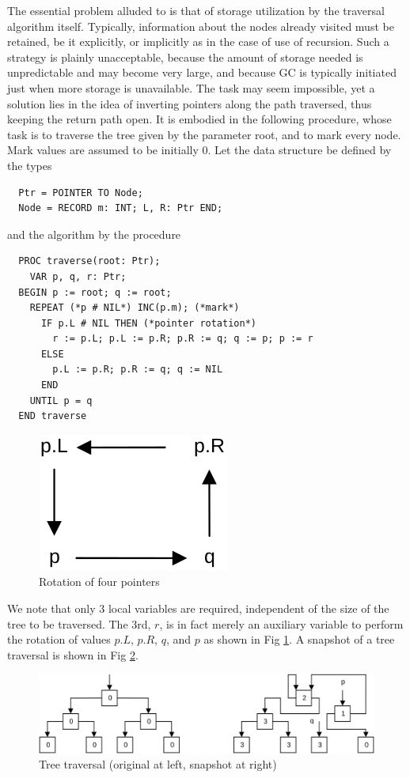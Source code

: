 The essential problem alluded to is that of storage utilization by the traversal algorithm itself.
Typically, information about the nodes already visited must be retained, be it explicitly, or
implicitly as in the case of use of recursion. Such a strategy is plainly unacceptable,
because the amount of storage needed is unpredictable and may become very large, and because
GC is typically initiated just when more storage is unavailable. The task may seem impossible,
yet a solution lies in the idea of inverting pointers along the path traversed, thus keeping
the return path open. It is embodied in the following procedure, whose task is to traverse
the tree given by the parameter root, and to mark every node. Mark values are assumed to
be initially 0. Let the data structure be defined by the types
\begin{verbatim}
  Ptr = POINTER TO Node;
  Node = RECORD m: INT; L, R: Ptr END;
\end{verbatim}
and the algorithm by the procedure
\begin{verbatim}
  PROC traverse(root: Ptr);
    VAR p, q, r: Ptr;
  BEGIN p := root; q := root;
    REPEAT (*p # NIL*) INC(p.m); (*mark*)
      IF p.L # NIL THEN (*pointer rotation*)
        r := p.L; p.L := p.R; p.R := q; q := p; p := r
      ELSE
        p.L := p.R; p.R := q; q := NIL
      END
    UNTIL p = q
  END traverse
\end{verbatim}
\begin{figure}[h!]
  \centering
  \includegraphics[width=.25\textwidth]{i/s}
  \caption{Rotation of four pointers}
  \label{fig:rotation}
\end{figure}
We note that only 3 local variables are required, independent of the size of the tree to be
traversed. The 3rd, $r$, is in fact merely an auxiliary variable to perform the rotation of
values $p.L$, $p.R$, $q$, and $p$ as shown in Fig \ref{fig:rotation}. A snapshot of a tree
traversal is shown in Fig \ref{fig:tree-traversal}.
\begin{figure}[h!]
  \centering
  \includegraphics[width=\textwidth]{i/t}
  \caption{Tree traversal (original at left, snapshot at right)}
  \label{fig:tree-traversal}
\end{figure}

